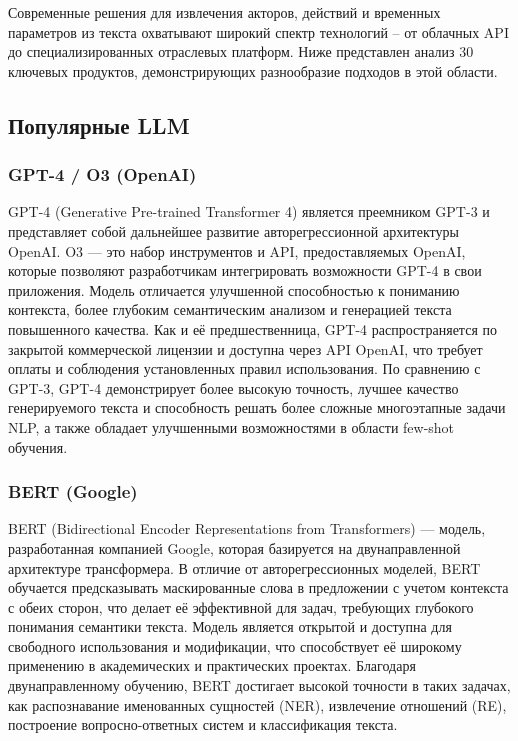 Современные решения для извлечения акторов, действий и временных параметров из текста охватывают широкий спектр технологий – от облачных API до специализированных отраслевых платформ. Ниже представлен анализ 30 ключевых продуктов, демонстрирующих разнообразие подходов в этой области.

\subsection{Популярные LLM}

\subsubsection{GPT-4 / O3 (OpenAI)}

GPT-4 (Generative Pre-trained Transformer 4) является преемником GPT-3 и представляет собой дальнейшее развитие авторегрессионной архитектуры OpenAI. O3 — это набор инструментов и API, предоставляемых OpenAI, которые позволяют разработчикам интегрировать возможности GPT-4 в свои приложения. Модель отличается улучшенной способностью к пониманию контекста, более глубоким семантическим анализом и генерацией текста повышенного качества. Как и её предшественница, GPT-4 распространяется по закрытой коммерческой лицензии и доступна через API OpenAI, что требует оплаты и соблюдения установленных правил использования. По сравнению с GPT-3, GPT-4 демонстрирует более высокую точность, лучшее качество генерируемого текста и способность решать более сложные многоэтапные задачи NLP, а также обладает улучшенными возможностями в области few-shot обучения.

\subsubsection{BERT (Google)}

BERT (Bidirectional Encoder Representations from Transformers) — модель, разработанная компанией Google, которая базируется на двунаправленной архитектуре трансформера. В отличие от авторегрессионных моделей, BERT обучается предсказывать маскированные слова в предложении с учетом контекста с обеих сторон, что делает её эффективной для задач, требующих глубокого понимания семантики текста. Модель является открытой и доступна для свободного использования и модификации, что способствует её широкому применению в академических и практических проектах. Благодаря двунаправленному обучению, BERT достигает высокой точности в таких задачах, как распознавание именованных сущностей (NER), извлечение отношений (RE), построение вопросно-ответных систем и классификация текста.

